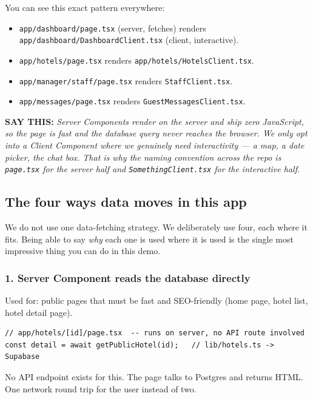 \documentclass[11pt,a4paper]{article}
\newcommand{\saythis}[1]{\begin{saybox}\textbf{\small\color{primary}SAY THIS:} \textit{#1}\end{saybox}}
\newcommand{\file}[1]{\texttt{\small #1}}
\begin{document}
You can see this exact pattern everywhere:

\begin{itemize}[leftmargin=*,noitemsep]
  \item \file{app/dashboard/page.tsx} (server, fetches) renders
        \file{app/dashboard/DashboardClient.tsx} (client, interactive).
  \item \file{app/hotels/page.tsx} renders \file{app/hotels/HotelsClient.tsx}.
  \item \file{app/manager/staff/page.tsx} renders \file{StaffClient.tsx}.
  \item \file{app/messages/page.tsx} renders \file{GuestMessagesClient.tsx}.
\end{itemize}

\saythis{Server Components render on the server and ship zero JavaScript, so the
page is fast and the database query never reaches the browser. We only opt into
a Client Component where we genuinely need interactivity --- a map, a date picker,
the chat box. That is why the naming convention across the repo is
\texttt{page.tsx} for the server half and \texttt{SomethingClient.tsx} for the
interactive half.}

\subsection{The four ways data moves in this app}

We do not use one data-fetching strategy. We deliberately use four, each where
it fits. Being able to say \emph{why} each one is used where it is used is the
single most impressive thing you can do in this demo.

\subsubsection{1. Server Component reads the database directly}

Used for: public pages that must be fast and SEO-friendly (home page, hotel
list, hotel detail page).

\begin{lstlisting}[language=TS]
// app/hotels/[id]/page.tsx  -- runs on server, no API route involved
const detail = await getPublicHotel(id);   // lib/hotels.ts -> Supabase
\end{lstlisting}

No API endpoint exists for this. The page talks to Postgres and returns HTML.
One network round trip for the user instead of two.
\end{document}
